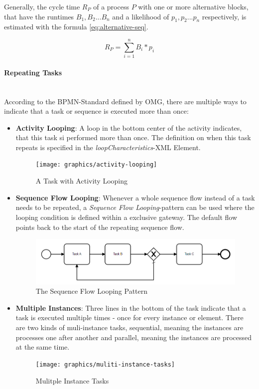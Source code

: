 Generally, the cycle time $R_P$ of a process $P$ with one or more alternative blocks, that have the runtimes $B_1,B_2 ... B_n$ and a likelihood of $p_1,p_2 ... p_n$ respectively, is estimated with the formula \ref{eq:alternative-seq}. \cite{fundamentals}

\begin{equation}\label{eq:alternative-seq}
	R_P = \displaystyle\sum_{i=1}^{n} B_i * p_i
\end{equation}

\paragraph{Repeating Tasks}~\\
According to the BPMN-Standard\cite{bpmnstandard} defined by OMG, there are multiple ways to indicate that a task or sequence is executed more than once: 

\begin{itemize}
	\item \textbf{Activity Looping}: A loop in the bottom center of the activity indicates, that this task si performed more than once. The definition on when this task repeats is specified in the \textit{loopCharacteristics}-XML Element.
	\begin{figure}[H]
		\centering
		\texttt{[image: graphics/activity-looping]}
		\caption{A Task with Activity Looping} 
		\label{fig:activity-looping} 
	\end{figure}
	\item \textbf{Sequence Flow Looping}: Whenever a whole sequence flow instead of a task needs to be repeated, a \textit{Sequence Flow Looping}-pattern can be used where the looping condition is defined within a exclusive gateway. The default flow points back to the start of the repeating sequence flow. 
	\begin{figure}[H]
		\centering
		\includegraphics[width=0.5\columnwidth]{graphics/sequence-flow-looping}
		\caption{The Sequence Flow Looping Pattern} 
		\label{fig:sequence-flow-looping} 
	\end{figure}
	\item \textbf{Multiple Instances}: Three lines in the bottom of the task indicate that a task is executed multiple times - once for every instance or element. There are two kinds of muli-instance tasks, sequential, meaning the instances are processes one after another and parallel, meaning the instances are processed at the same time. 
	\begin{figure}[H]
		\centering
		\texttt{[image: graphics/muliti-instance-tasks]}
		\caption{Mulitple Instance Tasks} 
		\label{fig:muliti-instance-tasks} 
	\end{figure}
\end{itemize}


